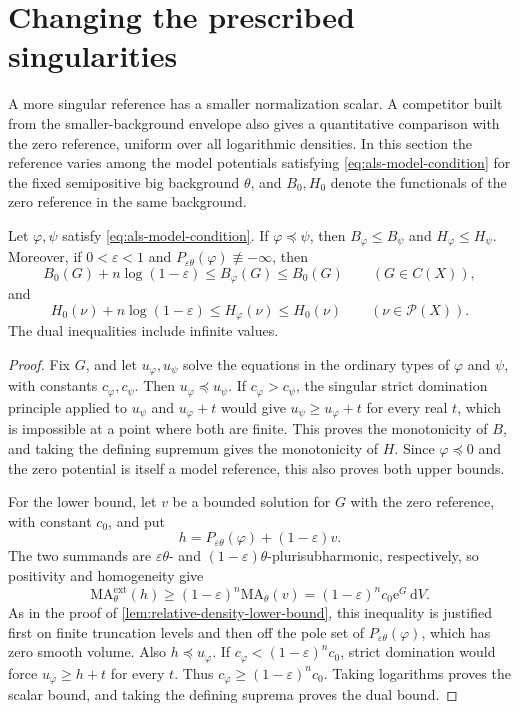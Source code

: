 \section{Changing the prescribed singularities}

A more singular reference has a smaller normalization scalar. A competitor built from the smaller-background envelope also gives a quantitative comparison with the zero reference, uniform over all logarithmic densities. In this section the reference varies among the model potentials satisfying \eqref{eq:als-model-condition} for the fixed semipositive big background $\theta$, and $B_0,H_0$ denote the functionals of the zero reference in the same background.

\begin{proposition}\label{prop:reference-normalization-comparison}
Let $\varphi,\psi$ satisfy \eqref{eq:als-model-condition}. If $\varphi\preceq\psi$, then $B_\varphi\leq B_\psi$ and $H_\varphi\leq H_\psi$. Moreover, if $0<\varepsilon<1$ and $P_{\varepsilon\theta}(\varphi)\not\equiv-\infty$, then
\[
 B_0(G)+n\log(1-\varepsilon)
       \leq B_\varphi(G)\leq B_0(G)
       \qquad(G\in C(X)),
\]
and
\[
 H_0(\nu)+n\log(1-\varepsilon)
       \leq H_\varphi(\nu)\leq H_0(\nu)
       \qquad(\nu\in\mathcal P(X)).
\]
The dual inequalities include infinite values.
\end{proposition}
\begin{proof}
Fix $G$, and let $u_\varphi,u_\psi$ solve the equations in the ordinary types of $\varphi$ and $\psi$, with constants $c_\varphi,c_\psi$. Then $u_\varphi\preceq u_\psi$. If $c_\varphi>c_\psi$, the singular strict domination principle applied to $u_\psi$ and $u_\varphi+t$ would give $u_\psi\geq u_\varphi+t$ for every real $t$, which is impossible at a point where both are finite. This proves the monotonicity of $B$, and taking the defining supremum gives the monotonicity of $H$. Since $\varphi\preceq0$ and the zero potential is itself a model reference, this also proves both upper bounds.

For the lower bound, let $v$ be a bounded solution for $G$ with the zero reference, with constant $c_0$, and put
\[
 h=P_{\varepsilon\theta}(\varphi)+(1-\varepsilon)v.
\]
The two summands are $\varepsilon\theta$- and $(1-\varepsilon)\theta$-plurisubharmonic, respectively, so positivity and homogeneity give
\[
 \mathrm{MA}^{\mathrm{ext}}_\theta(h)
       \geq(1-\varepsilon)^n\mathrm{MA}_\theta(v)
       =(1-\varepsilon)^nc_0\mathrm{e}^G\,\mathrm{d}V.
\]
As in the proof of \cref{lem:relative-density-lower-bound}, this inequality is justified first on finite truncation levels and then off the pole set of $P_{\varepsilon\theta}(\varphi)$, which has zero smooth volume. Also $h\preceq u_\varphi$. If $c_\varphi<(1-\varepsilon)^nc_0$, strict domination would force $u_\varphi\geq h+t$ for every $t$. Thus $c_\varphi\geq(1-\varepsilon)^nc_0$. Taking logarithms proves the scalar bound, and taking the defining suprema proves the dual bound.
\end{proof}

